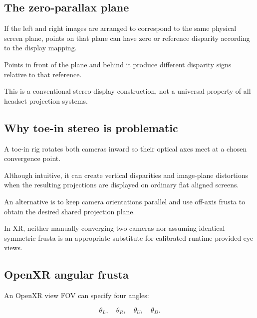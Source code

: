 \subsection{The zero-parallax plane}\label{02-foundations-ii-ch035-the-zero-parallax-plane}

\hypertarget{02-foundations-ii-ch035-the-zero-parallax-plane}{}

If the left and right images are arranged to correspond to the same physical screen plane, points on that plane can have zero or reference disparity according to the display mapping.

Points in front of the plane and behind it produce different disparity signs relative to that reference.

This is a conventional stereo-display construction, not a universal property of all headset projection systems.

\subsection{Why toe-in stereo is problematic}\label{02-foundations-ii-ch035-why-toe-in-stereo-is-problematic}

\hypertarget{02-foundations-ii-ch035-why-toe-in-stereo-is-problematic}{}

A toe-in rig rotates both cameras inward so their optical axes meet at a chosen convergence point.

Although intuitive, it can create vertical disparities and image-plane distortions when the resulting projections are displayed on ordinary flat aligned screens.

An alternative is to keep camera orientations parallel and use off-axis frusta to obtain the desired shared projection plane.

In XR, neither manually converging two cameras nor assuming identical symmetric frusta is an appropriate substitute for calibrated runtime-provided eye views.

\subsection{OpenXR angular frusta}\label{02-foundations-ii-ch035-openxr-angular-frusta}

\hypertarget{02-foundations-ii-ch035-openxr-angular-frusta}{}

An OpenXR view FOV can specify four angles:

\[ \theta_L,\quad\theta_R,\quad\theta_U,\quad\theta_D. \]

